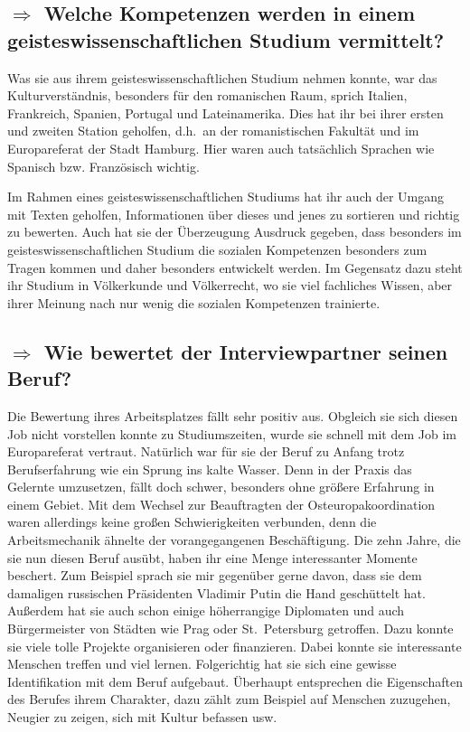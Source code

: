 \documentclass{../../sem_paper}
\newcommand\quest[1]{\subsection*{$\Rightarrow$ #1}}
\begin{document}
\quest{Welche Kompetenzen werden in einem geisteswissenschaftlichen Studium vermittelt?}
Was sie aus ihrem geisteswissenschaftlichen Studium nehmen konnte, war das Kulturverständnis, besonders für den romanischen Raum, sprich Italien, Frankreich, Spanien, Portugal und Lateinamerika. Dies hat ihr bei ihrer ersten und zweiten Station geholfen, d.h.\ an der romanistischen Fakultät und im Europareferat der Stadt Hamburg. Hier waren auch tatsächlich Sprachen wie Spanisch bzw. Französisch wichtig.

Im Rahmen eines geisteswissenschaftlichen Studiums hat ihr auch der Umgang mit Texten geholfen, Informationen über dieses und jenes zu sortieren und richtig zu bewerten. Auch hat sie der Überzeugung Ausdruck gegeben, dass besonders im geisteswissenschaftlichen Studium die sozialen Kompetenzen besonders zum Tragen kommen und daher besonders entwickelt werden. Im Gegensatz dazu steht ihr Studium in Völkerkunde und Völkerrecht, wo sie viel fachliches Wissen, aber ihrer Meinung nach nur wenig die sozialen Kompetenzen trainierte.

\quest{Wie bewertet der Interviewpartner seinen Beruf?}
Die Bewertung ihres Arbeitsplatzes fällt sehr positiv aus. Obgleich sie sich diesen Job nicht vorstellen konnte zu Studiumszeiten, wurde sie schnell mit dem Job im Europareferat vertraut. Natürlich war für sie der Beruf zu Anfang trotz Berufserfahrung wie ein Sprung ins kalte Wasser. Denn in der Praxis das Gelernte umzusetzen, fällt doch schwer, besonders ohne größere Erfahrung in einem Gebiet.
Mit dem Wechsel zur Beauftragten der Osteuropakoordination waren allerdings keine großen Schwierigkeiten verbunden, denn die Arbeitsmechanik ähnelte der vorangegangenen Beschäftigung.
Die zehn Jahre, die sie nun diesen Beruf ausübt, haben ihr eine Menge interessanter Momente beschert. Zum Beispiel sprach sie mir gegenüber gerne davon, dass sie dem damaligen russischen Präsidenten Vladimir Putin die Hand geschüttelt hat. Außerdem hat sie auch schon einige höherrangige Diplomaten  und auch Bürgermeister von Städten wie Prag oder St.\ Petersburg  getroffen.
Dazu konnte sie viele tolle Projekte organisieren oder finanzieren. Dabei konnte sie interessante Menschen treffen und viel lernen. Folgerichtig hat sie sich eine gewisse Identifikation mit dem Beruf aufgebaut.
Überhaupt entsprechen die Eigenschaften des Berufes ihrem Charakter, dazu zählt zum Beispiel auf Menschen zuzugehen, Neugier zu zeigen, sich mit Kultur befassen usw.
\end{document}
